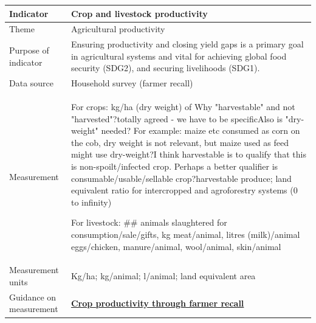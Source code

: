 \documentclass[
  letterpaper,
  DIV=11,
  numbers=noendperiod]{scrreprt}
\begin{document}
\begin{longtable}[]{@{}
  >{\raggedright\arraybackslash}p{}
  >{\raggedright\arraybackslash}p{}@{}}
\toprule\noalign{}
\begin{minipage}[b]{\linewidth}\raggedright
\textbf{Indicator}
\end{minipage} & \begin{minipage}[b]{\linewidth}\raggedright
\textbf{Crop and livestock productivity}
\end{minipage} \\
\midrule\noalign{}
\endhead
\bottomrule\noalign{}
\endlastfoot
Theme & Agricultural productivity \\
Purpose of indicator & Ensuring productivity and closing yield gaps is a
primary goal in agricultural systems and vital for achieving global food
security (SDG2), and securing livelihoods (SDG1). \\
Data source & Household survey (farmer recall) \\
Measurement & For crops: kg/ha (dry weight) of
\label{75}{Why "harvestable" and not
"harvested"?}\label{76}{totally agreed - we have to be
specific}\label{77}{Also is "dry-weight" needed? For
example: maize etc consumed as corn on the cob, dry weight is not
relevant, but maize used as feed might use
dry-weight?}\label{78}{I think harvestable is to qualify
that this is non-spoilt/infected crop. Perhaps a better qualifier is
consumable/usable/sellable crop?}harvestable
\label{75}{\label{76}{\label{77}{\label{78}{}}}}produce;
land equivalent ratio for intercropped and agroforestry systems (0 to
infinity)

For livestock: \#\# animals slaughtered for consumption/sale/gifts, kg
meat/animal, litres (milk)/animal {eggs/chicken, manure/animal}{,
wool/animal,} {}{skin/animal} \\
Measurement units & Kg/ha; kg/animal; l/animal; land equivalent area \\
Guidance on measurement & \begin{minipage}[t]{\linewidth}\raggedright
\textbf{\ul{Crop productivity through farmer recall}}


\end{minipage}
\end{longtable}
\end{document}
